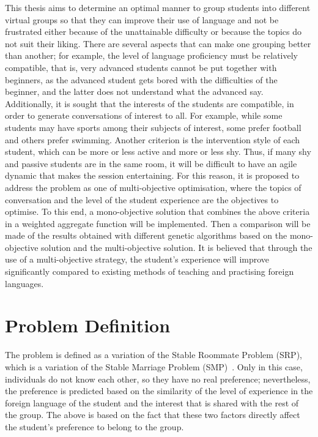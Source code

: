This thesis aims to determine an optimal manner to group students into different virtual groups so that they can improve their use of language and not be frustrated either because of the unattainable difficulty or because the topics do not suit their liking. There are several aspects that can make one grouping better than another; for example, the level of language proficiency must be relatively compatible, that is, very advanced students cannot be put together with beginners, as the advanced student gets bored with the difficulties of the beginner, and the latter does not understand what the advanced say. Additionally, it is sought that the interests of the students are compatible, in order to generate conversations of interest to all. For example, while some students may have sports among their subjects of interest, some prefer football and others prefer swimming. Another criterion is the intervention style of each student, which can be more or less active and more or less shy. Thus, if many shy and passive students are in the same room, it will be difficult to have an agile dynamic that makes the session entertaining. For this reason, it is proposed to address the problem as one of multi-objective optimisation, where the topics of conversation and the level of the student experience are the objectives to optimise. To this end, a mono-objective solution that combines the above criteria in a weighted aggregate function will be implemented. Then a comparison will be made of the results obtained with different genetic algorithms based on the mono-objective solution and the multi-objective solution. It is believed that through the use of a multi-objective strategy, the student's experience will improve significantly compared to existing methods of teaching and practising foreign languages.\\

\section{Problem Definition}

The problem is defined as a variation of the Stable Roommate Problem (SRP), which is a variation of the Stable Marriage Problem (SMP)~\cite{Iwama_SMP_variants}. Only in this case, individuals do not know each other, so they have no real preference; nevertheless, the preference is predicted based on the similarity of the level of experience in the foreign language of the student and the interest that is shared with the rest of the group. The above is based on the fact that these two factors directly affect the student's preference to belong to the group.\\

